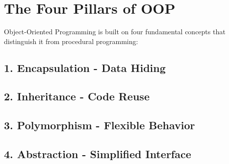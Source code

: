 \hypertarget{the-four-pillars-of-oop}{%
\section{The Four Pillars of OOP}\label{the-four-pillars-of-oop}}

Object-Oriented Programming is built on four fundamental concepts that
distinguish it from procedural programming:

\hypertarget{encapsulation---data-hiding}{%
\subsection{\texorpdfstring{1. \textbf{Encapsulation} - Data
Hiding}{1. Encapsulation - Data Hiding}}\label{encapsulation---data-hiding}}

\hypertarget{inheritance---code-reuse}{%
\subsection{\texorpdfstring{2. \textbf{Inheritance} - Code
Reuse}{2. Inheritance - Code Reuse}}\label{inheritance---code-reuse}}

\hypertarget{polymorphism---flexible-behavior}{%
\subsection{\texorpdfstring{3. \textbf{Polymorphism} - Flexible
Behavior}{3. Polymorphism - Flexible Behavior}}\label{polymorphism---flexible-behavior}}

\hypertarget{abstraction---simplified-interface}{%
\subsection{\texorpdfstring{4. \textbf{Abstraction} - Simplified
Interface}{4. Abstraction - Simplified Interface}}\label{abstraction---simplified-interface}}

